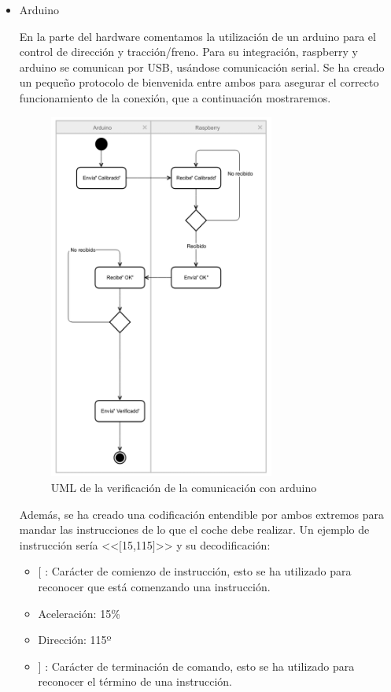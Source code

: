 \documentclass{pclass}
\begin{document}
\begin{itemize}
\begin{itemize}
\begin{itemize}
		\end{itemize}
	\medskip
	\item Arduino
	
	En la parte del hardware comentamos la utilización de un arduino para el control de dirección y tracción/freno. Para su integración, raspberry y arduino se comunican por USB, usándose comunicación serial. Se ha creado un pequeño protocolo de bienvenida entre ambos para asegurar el correcto funcionamiento de la conexión, que a continuación mostraremos.
	
	\begin{figure}[H]
		\centering
		\includegraphics[width=0.7\textwidth]{img/umlComunicacion}
		\caption{UML de la verificación de la comunicación con arduino}
		\label{fig:arduinoVerificacion}
	\end{figure}
	
	Además, se ha creado una codificación entendible por ambos extremos para mandar las instrucciones de lo que el coche debe realizar. Un ejemplo de instrucción sería <<$[$15,115$]$>> y su decodificación:
	\begin{itemize}
		\item $[$ : Carácter de comienzo de instrucción, esto se ha utilizado para reconocer que está comenzando una instrucción.
		\item Aceleración: 15\% 
		\item Dirección: 115º
		\item $]$ : Carácter de terminación de comando, esto se ha utilizado para reconocer el término de una instrucción.
	\end{itemize}
	

\end{itemize}
\end{itemize}
\end{document}

